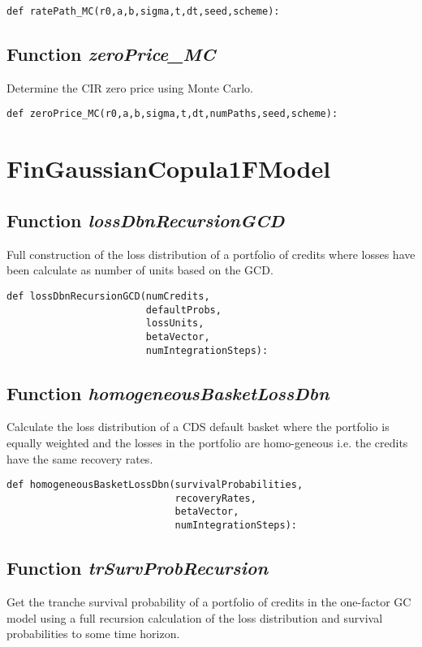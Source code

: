 \documentclass[twoside,11pt]{book}
\begin{document}
\begin{lstlisting}
def ratePath_MC(r0,a,b,sigma,t,dt,seed,scheme):
\end{lstlisting}

\subsection{Function {\it zeroPrice\_MC}}
Determine the CIR zero price using Monte Carlo. 

\begin{lstlisting}
def zeroPrice_MC(r0,a,b,sigma,t,dt,numPaths,seed,scheme):
\end{lstlisting}

\newpage
\section{FinGaussianCopula1FModel}

\subsection{Function {\it lossDbnRecursionGCD}}
Full construction of the loss distribution of a portfolio of credits where losses have been calculate as number of units based on the GCD. 

\begin{lstlisting}
def lossDbnRecursionGCD(numCredits, 
                        defaultProbs, 
                        lossUnits,
                        betaVector,
                        numIntegrationSteps):
\end{lstlisting}

\subsection{Function {\it homogeneousBasketLossDbn}}
Calculate the loss distribution of a CDS default basket where the portfolio is equally weighted and the losses in the portfolio are homo-geneous i.e. the credits have the same recovery rates. 

\begin{lstlisting}
def homogeneousBasketLossDbn(survivalProbabilities,
                             recoveryRates,
                             betaVector,
                             numIntegrationSteps):
\end{lstlisting}

\subsection{Function {\it trSurvProbRecursion}}
Get the tranche survival probability of a portfolio of credits in the one-factor GC model using a full recursion calculation of the loss distribution and survival probabilities to some time horizon. 
\end{document}
